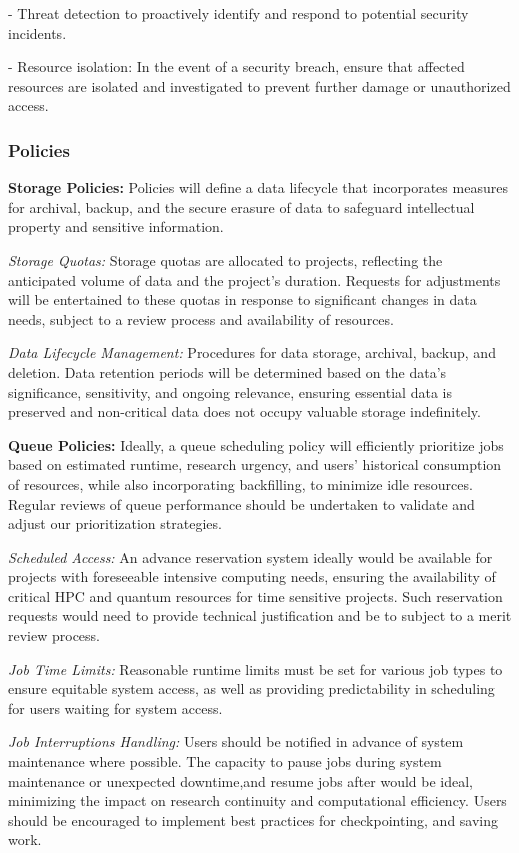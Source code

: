 - Threat detection to proactively identify and respond to potential security incidents.

- Resource isolation: In the event of a security breach, ensure that affected resources are isolated and investigated to prevent further damage or unauthorized access.

\subsubsection{Policies}


\textbf{Storage Policies:} Policies will define a data lifecycle that incorporates measures for archival, backup, and the secure erasure of data to safeguard intellectual property and sensitive information.

\textit{Storage Quotas:} Storage quotas are allocated to projects, reflecting the anticipated volume of data and the project's duration. Requests for adjustments will be entertained to these quotas in response to significant changes in data needs, subject to a review process and availability of resources.

\textit{Data Lifecycle Management:} Procedures for data storage, archival, backup, and deletion. Data retention periods will be determined  based on the data's significance, sensitivity, and ongoing relevance, ensuring essential data is preserved and non-critical data does not occupy valuable storage indefinitely.

\textbf{Queue Policies:} Ideally, a queue scheduling policy will efficiently prioritize jobs based on estimated runtime, research urgency, and users' historical consumption of resources, while also incorporating backfilling, to minimize idle resources. Regular reviews of queue performance should be undertaken to validate and adjust our prioritization strategies.

\textit{Scheduled Access:} An advance reservation system ideally would be available for projects with foreseeable intensive computing needs, ensuring the availability of critical HPC and quantum resources for time sensitive projects. Such reservation requests would need to provide technical justification and be to subject to a merit review process. 

\textit{Job Time Limits:} Reasonable runtime limits must be set for various job types to ensure equitable system access, as well as providing predictability in scheduling for users waiting for system access.


\textit{Job Interruptions Handling:} Users should be notified in advance of system maintenance where possible. The capacity to pause jobs during system maintenance or unexpected downtime,and resume jobs after would be ideal, minimizing the impact on research continuity and computational efficiency. Users should be encouraged to implement best practices for checkpointing, and saving work.  



